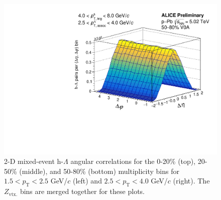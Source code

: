 \begin{figure}[ht]
\begin{minipage}{0.48\textwidth}
		\includegraphics[width=\textwidth]{figures/analysis/h_lambda_2d_mixed_fancy_label_50_80_highpt.pdf}
	\end{minipage}
	\caption{2-D mixed-event h-$\Lambda$ angular correlations for the 0-20\% (top), 20-50\% (middle), and 50-80\% (bottom) multiplicity bins for $1.5 < p_{\text{T}} < 2.5$ GeV/$c$ (left) and $2.5 < p_{\text{T}} < 4.0$ GeV/$c$ (right). The $Z_{\text{vtx.}}$ bins are merged together for these plots.}
	\label{fig:h_lambda_2d_mixed}
\end{figure}
